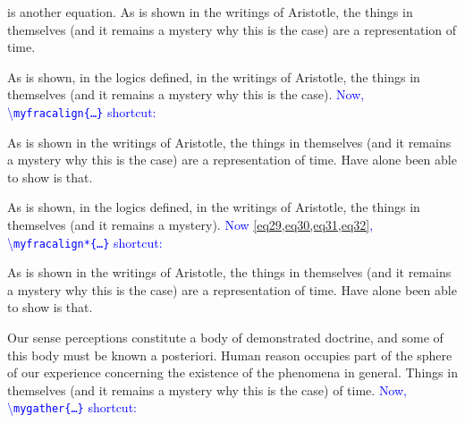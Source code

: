 \documentclass[phd]{ndsu-thesis-2022}
\newcommand\italk[1]{\textcolor{blue}{#1}}  %
\newcommand\cmd[1]{\textbackslash\texttt{#1}}  %
\begin{document}

\noindent \noindent {} is another equation. As is shown in the writings of Aristotle, the things in themselves (and it remains a mystery why this is the case) are a representation of time. 

As is shown, in the logics defined, in the writings of Aristotle, the things in themselves (and it remains a mystery why this is the case). \italk{Now, \cmd{myfracalign\{\ldots\}} shortcut:} 


\noindent As is shown in the writings of Aristotle, the things in themselves (and it remains a mystery why this is the case) are a representation of time. Have alone been able to show is that.

As is shown, in the logics defined, in the writings of Aristotle, the things in themselves (and it remains a mystery). \italk{Now \cref{eq29,eq30,eq31,eq32}, \cmd{myfracalign*\{\ldots\}} shortcut:} 


\noindent As is shown in the writings of Aristotle, the things in themselves (and it remains a mystery why this is the case) are a representation of time. Have alone been able to show is that.


Our sense perceptions constitute a body of demonstrated doctrine, and some of this body must be known a posteriori. Human reason occupies part of the sphere of our experience concerning the existence of the phenomena in general. Things in themselves (and it remains a mystery why this is the case) of time. \italk{Now, \cmd{mygather\{\ldots\}} shortcut:}

\end{document}
